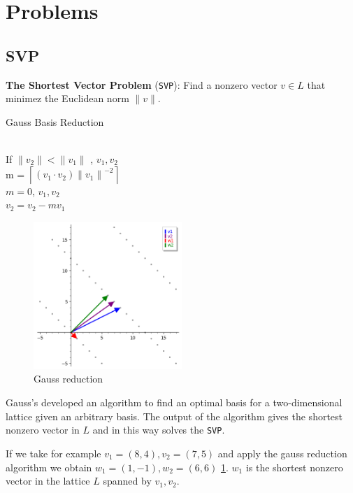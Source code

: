 \documentclass[a4paper,12pt]{report}
\begin{document}
\section{Problems}

\subsection{SVP}

\textbf{The Shortest Vector Problem} (\texttt{SVP}): Find a nonzero vector $v \in L$ that minimez the Euclidean norm $\lVert v \rVert$.

\begin{algorithm}
    \caption{Gauss Basis Reduction}
    \vspace*{5px}
     \\
    If $\lVert v_2 \rVert < \lVert v_1 \rVert$ , $v_1, v_2$ \\
    m = $\left \lceil{(v_1 \cdot v_2) {\lVert v_1 \rVert}^{-2}} \right \rceil$ \\
     $m = 0$,  $v_1, v_2$ \\
    $v_2 = v_2 - mv_1$ \\
\end{algorithm}

\begin{figure}[b]
    \centering
    \includegraphics[width=0.5\textwidth]{./img/gauss_svp.png}
    \caption{Gauss reduction}
    \label{fig:gauss_svp}
\end{figure}

Gauss's developed an algorithm to find an optimal basis for a two-dimensional lattice given an arbitrary basis. The output of the algorithm
gives the shortest nonzero vector in $L$ and in this way solves the \texttt{SVP}.

If we take for example $v_1 = (8, 4), v_2 = (7, 5)$ and apply the gauss reduction algorithm we
obtain $w_1 = (1, -1), w_2 = (6, 6)$ \ref{fig:gauss_svp}. $w_1$ is the shortest nonzero vector in the lattice $L$ spanned by $v_1, v_2$.
\end{document}
